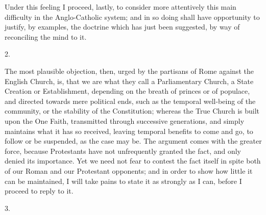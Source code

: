 Under this feeling I proceed, lastly, to consider more attentively
this main difficulty in the Anglo-Catholic system; and in so doing
shall have opportunity to justify, by examples, the doctrine which has
just been suggested, by way of reconciling the mind to it.

2.

The most plausible objection, then, urged by the partisans of Rome
against the English Church, is, that we are what they call a
Parliamentary Church, a State Creation or Establishment, depending on
the breath of princes or of populace, and directed towards mere
political ends, such as the temporal well-being of the community, or
the stability of the Constitution; whereas the True Church is built
upon the One Faith, transmitted through successive generations, and
simply maintains what it has so received, leaving temporal benefits to
come and go, to follow or be suspended, as the case may be. The
argument comes with the greater force, because Protestants have not
unfrequently granted the fact, and only denied its importance. Yet we
need not fear to contest the fact itself in spite both of our Roman
and our Protestant opponents; and in order to show how little it can
be maintained, I will take pains to state it as strongly as I can,
before I proceed to reply to it.

3.

